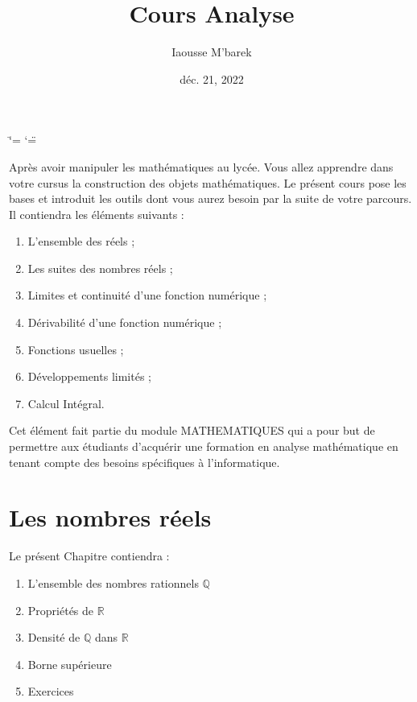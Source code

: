 \documentclass[letterpaper,10pt,french]{jupyterBook}
\title{Cours Analyse}
\date{déc. 21, 2022}
\author{Iaousse M'barek}
\begin{document}
\ifdefined\shorthandoff
  \ifnum\catcode`\=\string=\active\shorthandoff{=}\fi
  \ifnum\catcode`\"=\active{}\fi
\fi

\pagestyle{empty}
\sphinxmaketitle
\pagestyle{plain}
\sphinxtableofcontents
\pagestyle{normal}
\label{\detokenize{intro::doc}}


\sphinxAtStartPar
Après avoir manipuler les mathématiques au lycée. Vous allez apprendre dans votre cursus la construction des objets mathématiques. Le présent cours pose les bases et introduit les outils dont vous aurez besoin par la suite de votre parcours. Il contiendra les éléments suivants :
\begin{enumerate}
%
\item {} 
\sphinxAtStartPar
L’ensemble des réels ;

\item {} 
\sphinxAtStartPar
Les suites des nombres réels ;

\item {} 
\sphinxAtStartPar
Limites et continuité d’une fonction numérique ;

\item {} 
\sphinxAtStartPar
Dérivabilité d’une fonction numérique ;

\item {} 
\sphinxAtStartPar
Fonctions usuelles ;

\item {} 
\sphinxAtStartPar
Développements limités ;

\item {} 
\sphinxAtStartPar
Calcul Intégral.

\end{enumerate}

\sphinxAtStartPar
Cet élément fait partie du module MATHEMATIQUES qui a pour but de permettre aux étudiants d’acquérir une formation en analyse mathématique en tenant compte des besoins spécifiques à l’informatique.


\chapter{Les nombres réels}
\label{\detokenize{R:les-nombres-reels}}\label{\detokenize{R::doc}}
\sphinxAtStartPar
Le présent Chapitre contiendra :
\begin{enumerate}
%
\item {} 
\sphinxAtStartPar
L’ensemble des nombres rationnels \(\mathbb{Q}\)

\item {} 
\sphinxAtStartPar
Propriétés de \(\mathbb{R}\)

\item {} 
\sphinxAtStartPar
Densité de \(\mathbb{Q}\) dans \(\mathbb{R}\)

\item {} 
\sphinxAtStartPar
Borne supérieure

\item {} 
\sphinxAtStartPar
Exercices

\end{enumerate}
\end{document}
